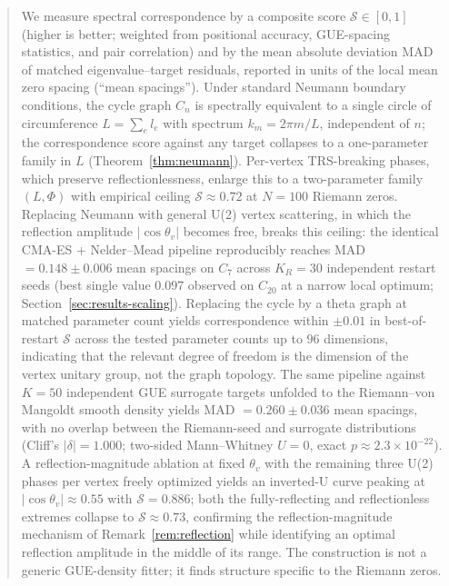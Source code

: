 \documentclass[cntp]{ipart}
\theoremstyle{plain}
\theoremstyle{remark}
\begin{document}
\begin{frontmatter}
\begin{abstract}
We measure spectral correspondence by a composite score $\mathcal{S} \in [0, 1]$ (higher is better; weighted from positional accuracy, GUE-spacing statistics, and pair correlation) and by the mean absolute deviation MAD of matched eigenvalue--target residuals, reported in units of the local mean zero spacing (``mean spacings''). Under standard Neumann boundary conditions, the cycle graph $C_n$ is spectrally equivalent to a single circle of circumference $L = \sum_e l_e$ with spectrum $k_m = 2\pi m / L$, independent of $n$; the correspondence score against any target collapses to a one-parameter family in $L$ (Theorem~\ref{thm:neumann}). Per-vertex TRS-breaking phases, which preserve reflectionlessness, enlarge this to a two-parameter family $(L, \Phi)$ with empirical ceiling $\mathcal{S} \approx 0.72$ at $N = 100$ Riemann zeros. Replacing Neumann with general U(2) vertex scattering, in which the reflection amplitude $|\cos\theta_v|$ becomes free, breaks this ceiling: the identical CMA-ES + Nelder--Mead pipeline reproducibly reaches MAD $= 0.148 \pm 0.006$ mean spacings on $C_7$ across $K_R = 30$ independent restart seeds (best single value $0.097$ observed on $C_{20}$ at a narrow local optimum; Section~\ref{sec:results-scaling}). Replacing the cycle by a theta graph at matched parameter count yields correspondence within $\pm 0.01$ in best-of-restart $\mathcal{S}$ across the tested parameter counts up to $96$ dimensions, indicating that the relevant degree of freedom is the dimension of the vertex unitary group, not the graph topology. The same pipeline against $K = 50$ independent GUE surrogate targets unfolded to the Riemann--von Mangoldt smooth density yields MAD $= 0.260 \pm 0.036$ mean spacings, with no overlap between the Riemann-seed and surrogate distributions (Cliff's $|\delta| = 1.000$; two-sided Mann--Whitney $U = 0$, exact $p \approx 2.3 \times 10^{-22}$). A reflection-magnitude ablation at fixed $\theta_v$ with the remaining three U(2) phases per vertex freely optimized yields an inverted-U curve peaking at $|\cos\theta_v| \approx 0.55$ with $\mathcal{S} = 0.886$; both the fully-reflecting and reflectionless extremes collapse to $\mathcal{S} \approx 0.73$, confirming the reflection-magnitude mechanism of Remark~\ref{rem:reflection} while identifying an optimal reflection amplitude in the middle of its range. The construction is not a generic GUE-density fitter; it finds structure specific to the Riemann zeros.
\end{abstract}

\begin{keyword}[class=MSC]
\end{keyword}

\begin{keyword}
\end{keyword}

\end{frontmatter}
\end{document}
